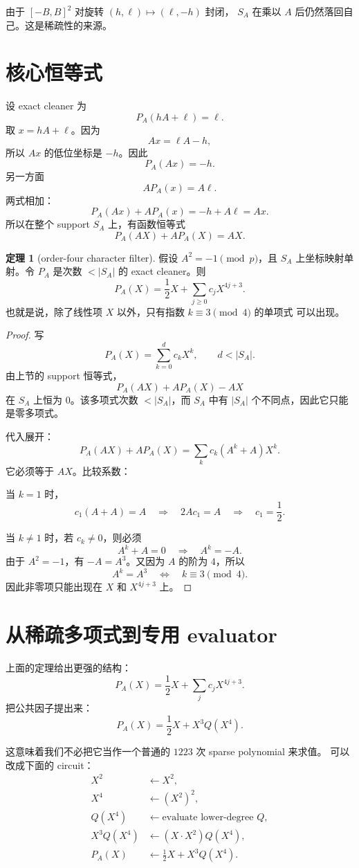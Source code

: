\documentclass[11pt,a4paper]{ctexart}
\theoremstyle{definition}
\newtheorem{theorem}{定理}
\begin{document}
由于 $[-B,B]^2$ 对旋转 $(h,\ell)\mapsto(\ell,-h)$ 封闭，
$S_A$ 在乘以 $A$ 后仍然落回自己。这是稀疏性的来源。

\section{核心恒等式}

设 exact cleaner 为
\[
  P_A(hA+\ell)=\ell.
\]
取 $x=hA+\ell$。因为
\[
  Ax=\ell A-h,
\]
所以 $Ax$ 的低位坐标是 $-h$。因此
\[
  P_A(Ax)=-h.
\]
另一方面
\[
  A P_A(x)=A\ell.
\]
两式相加：
\[
  P_A(Ax)+A P_A(x)= -h+A\ell=Ax.
\]
所以在整个 support $S_A$ 上，有函数恒等式
\[
  \boxed{P_A(AX)+A P_A(X)=AX.}
\]

\begin{theorem}[order-four character filter]
假设 $A^2=-1\pmod p$，且 $S_A$ 上坐标映射单射。令 $P_A$ 是次数
$<|S_A|$ 的 exact cleaner。则
\[
  P_A(X)=\frac{1}{2}X+\sum_{j\ge 0} c_jX^{4j+3}.
\]
也就是说，除了线性项 $X$ 以外，只有指数 $k\equiv 3\pmod 4$ 的单项式
可以出现。
\end{theorem}

\begin{proof}
写
\[
  P_A(X)=\sum_{k=0}^{d} c_kX^k,\qquad d<|S_A|.
\]
由上节的 support 恒等式，
\[
  P_A(AX)+A P_A(X)-AX
\]
在 $S_A$ 上恒为 $0$。该多项式次数 $<|S_A|$，而 $S_A$ 中有 $|S_A|$
个不同点，因此它只能是零多项式。

代入展开：
\[
  P_A(AX)+A P_A(X)
  =\sum_k c_k(A^k+A)X^k.
\]
它必须等于 $AX$。比较系数：

当 $k=1$ 时，
\[
  c_1(A+A)=A
  \quad\Rightarrow\quad
  2A c_1=A
  \quad\Rightarrow\quad
  c_1=\frac{1}{2}.
\]

当 $k\ne 1$ 时，若 $c_k\ne0$，则必须
\[
  A^k+A=0
  \quad\Rightarrow\quad
  A^k=-A.
\]
由于 $A^2=-1$，有 $-A=A^3$。又因为 $A$ 的阶为 $4$，所以
\[
  A^k=A^3
  \quad\Leftrightarrow\quad
  k\equiv 3\pmod4.
\]
因此非零项只能出现在 $X$ 和 $X^{4j+3}$ 上。
\end{proof}

\section{从稀疏多项式到专用 evaluator}

上面的定理给出更强的结构：
\[
  P_A(X)=\frac{1}{2}X+\sum_j c_jX^{4j+3}.
\]
把公共因子提出来：
\[
  \boxed{P_A(X)=\frac{1}{2}X+X^3Q(X^4).}
\]

这意味着我们不必把它当作一个普通的 $1223$ 次 sparse polynomial 来求值。
可以改成下面的 circuit：
\[
\begin{aligned}
  X^2 &\leftarrow X^2,\\
  X^4 &\leftarrow (X^2)^2,\\
  Q(X^4) &\leftarrow \text{evaluate lower-degree } Q,\\
  X^3Q(X^4) &\leftarrow (X\cdot X^2)Q(X^4),\\
  P_A(X)&\leftarrow \frac12 X+X^3Q(X^4).
\end{aligned}
\]
\end{document}
